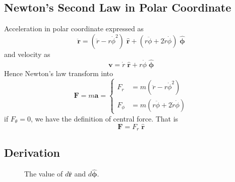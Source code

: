 \documentclass[../../../main.tex]{subfiles}
\begin{document}
\subsection{Newton's Second Law in Polar Coordinate}
Acceleration in polar coordinate expressed as
\begin{equation*}
    \mathbf{\ddot{r}}=\left(\ddot{r}-r\dot{\phi}^2\right) \; \mathbf{\hat{r}} + \left(r\ddot{\phi}+2\dot{r}\dot{\phi}\right) \;\boldsymbol{ \hat{\phi}}
\end{equation*}
and velocity as
\begin{equation*}
    \mathbf{v}=\dot{r}\;\mathbf{\hat{r}} +r\dot{\phi}\;\boldsymbol{ \hat{\phi}}
\end{equation*}
Hence Newton's law transform into
\begin{equation*}
    \mathbf{F}=m\mathbf{a}=\begin{cases}
        F_r    & =m\left(\ddot{r}-r\dot{\phi}^2\right)          \\
        F_\phi & =m\left(r\ddot{\phi}+2\dot{r}\dot{\phi}\right)
    \end{cases}
\end{equation*}
if $F_\theta=0$, we have the definition of central force.
That is
\begin{equation*}
    \mathbf{F}=F_r\;\mathbf{\hat{r}}
\end{equation*}

\subsection{Derivation}
\begin{figure*}[h]
    \centering
    \caption*{The value of $d\mathbf{\hat{r}}$ and $d\boldsymbol{\hat{\phi}}$.}
\end{figure*}
\end{document}
